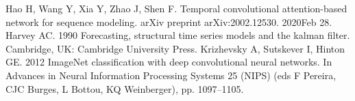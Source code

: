 \documentclass[12pt]{ctexart}
\begin{document}
\newpage
\clearpage
\lhead{\small \team}
\chead{}
\begin{thebibliography}{99}
   
     Hao H, Wang Y, Xia Y, Zhao J, Shen F. Temporal convolutional attention-based network for sequence modeling. arXiv preprint arXiv:2002.12530. 2020Feb 28.
     Harvey AC. 1990 Forecasting, structural time series models and the kalman filter. Cambridge, UK: Cambridge University Press.
     Krizhevsky A, Sutskever I, Hinton GE. 2012 ImageNet classification with deep convolutional neural networks. In Advances in Neural Information Processing Systems 25 (NIPS) (eds F Pereira, CJC Burges, L Bottou, KQ Weinberger), pp. 1097–1105.
    \end{thebibliography}
\end{document}
